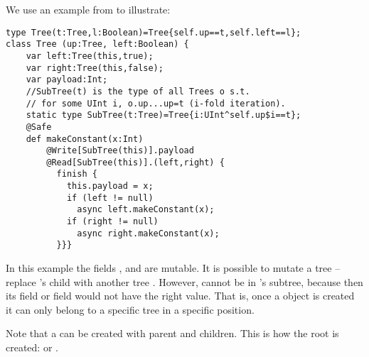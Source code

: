 




We use an example from \cite{DPJ} to illustrate:
  \begin{lstlisting}
type Tree(t:Tree,l:Boolean)=Tree{self.up==t,self.left==l};
class Tree (up:Tree, left:Boolean) {
    var left:Tree(this,true);
    var right:Tree(this,false);
    var payload:Int;
    //SubTree(t) is the type of all Trees o s.t.
    // for some UInt i, o.up...up=t (i-fold iteration).
    static type SubTree(t:Tree)=Tree{i:UInt^self.up$i==t};
    @Safe
    def makeConstant(x:Int)
        @Write[SubTree(this)].payload
        @Read[SubTree(this)].(left,right) {
          finish {
            this.payload = x;
            if (left != null)
              async left.makeConstant(x);
            if (right != null)
              async right.makeConstant(x);
          }}}
  \end{lstlisting}
In this example the fields , and 
are mutable. It is possible to mutate a tree  -- replace
's  child with another tree . However,  cannot be in
's  subtree, because then its  field or
 field would not have the right value. That is, once a
 object is created it can only belong to a specific tree in
a specific position.

Note that a  can be created with  parent and
children. This is how the root is created:
 or .


